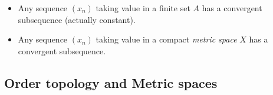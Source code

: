\begin{theorem}
    \begin{itemize}
        \item Any sequence $(x_n)$ taking value in a finite set $A$ has a convergent subsequence (actually constant).
        \item Any sequence $(x_n)$ taking value in a compact \emph{metric space} $X$ has a convergent subsequence.
    \end{itemize}
\end{theorem}



\subsection{Order topology and Metric spaces}




